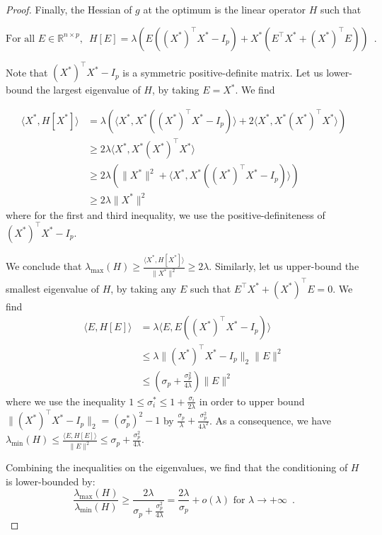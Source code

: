\documentclass[twoside,11pt]{article}
\begin{document}
\begin{proof}
    Finally, the Hessian of $g$ at the optimum is the linear operator $H$ such that 

    $$
    \text{For all } E\in\mathbb{R}^{n\times p}, \enspace H[E] = \lambda\left(E((X^*)^\top 
    X^* - I_p) + X^*(E^{\top}X^* + (X^*)^{\top}E)\right)\enspace.
    $$

    Note that $(X^*)^\top 
    X^* - I_p$ is a symmetric positive-definite matrix. Let us lower-bound the largest eigenvalue of $H$, by taking $E = X^*$. We find 

    \begin{align}
        \langle X^*, H[X^*]\rangle &= \lambda  \left(\langle X^*, X^*((X^*)^\top 
    X^* - I_p)\rangle + 2\langle X^*, X^* (X^*)^{\top}X^*\rangle \right)\\
    &\geq 2\lambda \langle X^*, X^* (X^*)^{\top}X^*\rangle\\
    &\geq 2\lambda (\|X^*\|^2 + \langle X^*, X^* ((X^*)^{\top}X^*-I_p)\rangle)\\ 
    &\geq 2\lambda \|X^*\|^2
    \end{align}
    where for the first and third inequality, we use the positive-definiteness of $(X^*)^\top 
    X^* - I_p$.

    We conclude that $\lambda_{\max}(H) \geq \frac{\langle X^*, H[X^*]\rangle}{\|X^*\|^2}\geq 2\lambda$.
    Similarly, let us upper-bound the smallest eigenvalue of $H$, by taking any $E$ such that $E^{\top}X^* + (X^*)^{\top}E = 0$. We find
     \begin{align}
        \langle E, H[E]\rangle &= \lambda  \langle E, E((X^*)^{\top}X^* - I_p)\rangle\\
        &\leq \lambda \|(X^*)^{\top}X^* - I_p\|_2\|E\|^2\\
        &\leq (\sigma_p + \frac{\sigma_p^2}{4\lambda}) \|E\|^2
    \end{align}
    where we use the inequality $1\leq \sigma_i^* \leq 1 + \frac{\sigma_i}{2\lambda}$ in order to upper bound $\|(X^*)^{\top}X^* - I_p\|_2 = (\sigma_p^*)^2 - 1$ by $\frac{\sigma_p}{\lambda} + \frac{\sigma_p^2}{4\lambda^2}$.
    As a consequence, we have $\lambda_{\min}(H)\leq \frac{\langle E, H[E]\rangle}{\|E\|^2}\leq \sigma_p + \frac{\sigma_p^2}{4\lambda}$.

    Combining the inequalities on the eigenvalues, we find that the conditioning of $H$ is lower-bounded by:
    $$
    \frac{\lambda_{\max}(H)}{\lambda_{\min}(H)}\geq \frac{2\lambda}{\sigma_p + \frac{\sigma_p^2}{4\lambda}} = \frac{2\lambda}{\sigma_p} + o(\lambda) \text{ for }\lambda \to +\infty\enspace.
    $$
\end{proof}
%
%
%
%
%
%
%
    
%
%
%
%
%
%
%
%
\end{document}
